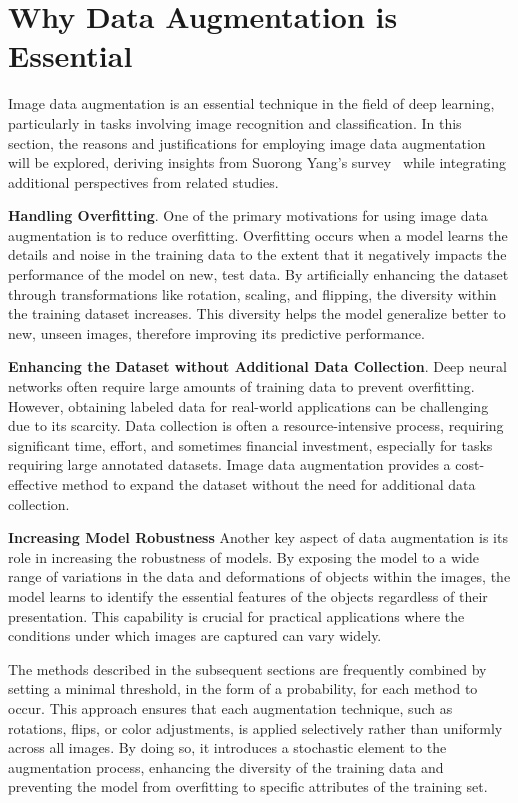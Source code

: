 \section{Why Data Augmentation is Essential}

Image data augmentation is an essential technique in the field of deep learning, particularly in tasks involving image recognition and classification. In this section, the reasons and justifications for employing image data augmentation will be explored, deriving insights from Suorong Yang's survey~\cite{DataAugmentationEssential} while integrating additional perspectives from related studies.

\textbf{Handling Overfitting}. One of the primary motivations for using image data augmentation is to reduce overfitting. Overfitting occurs when a model learns the details and noise in the training data to the extent that it negatively impacts the performance of the model on new, test data. By artificially enhancing the dataset through transformations like rotation, scaling, and flipping, the diversity within the training dataset increases. This diversity helps the model generalize better to new, unseen images, therefore improving its predictive performance.

\textbf{Enhancing the Dataset without Additional Data Collection}. Deep neural networks often require large amounts of training data to prevent overfitting. However, obtaining labeled data for real-world applications can be challenging due to its scarcity. Data collection is often a resource-intensive process, requiring significant time, effort, and sometimes financial investment, especially for tasks requiring large annotated datasets. Image data augmentation provides a cost-effective method to expand the dataset without the need for additional data collection.

\textbf{Increasing Model Robustness} Another key aspect of data augmentation is its role in increasing the robustness of models. By exposing the model to a wide range of variations in the data and deformations of objects within the images, the model learns to identify the essential features of the objects regardless of their presentation. This capability is crucial for practical applications where the conditions under which images are captured can vary widely.

The methods described in the subsequent sections are frequently combined by setting a minimal threshold, in the form of a probability, for each method to occur. This approach ensures that each augmentation technique, such as rotations, flips, or color adjustments, is applied selectively rather than uniformly across all images. By doing so, it introduces a stochastic element to the augmentation process, enhancing the diversity of the training data and preventing the model from overfitting to specific attributes of the training set.

